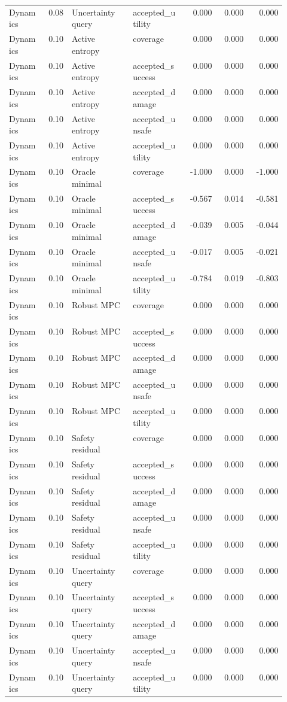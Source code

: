 \documentclass{article}
\begin{document}
\begin{center}
\begin{longtable}{p{0.13\linewidth}rp{0.22\linewidth}p{0.19\linewidth}rrr}
Dynamics & 0.08 & Uncertainty query & accepted\_utility & 0.000 & 0.000 & 0.000\\
Dynamics & 0.10 & Active entropy & coverage & 0.000 & 0.000 & 0.000\\
Dynamics & 0.10 & Active entropy & accepted\_success & 0.000 & 0.000 & 0.000\\
Dynamics & 0.10 & Active entropy & accepted\_damage & 0.000 & 0.000 & 0.000\\
Dynamics & 0.10 & Active entropy & accepted\_unsafe & 0.000 & 0.000 & 0.000\\
Dynamics & 0.10 & Active entropy & accepted\_utility & 0.000 & 0.000 & 0.000\\
Dynamics & 0.10 & Oracle minimal & coverage & -1.000 & 0.000 & -1.000\\
Dynamics & 0.10 & Oracle minimal & accepted\_success & -0.567 & 0.014 & -0.581\\
Dynamics & 0.10 & Oracle minimal & accepted\_damage & -0.039 & 0.005 & -0.044\\
Dynamics & 0.10 & Oracle minimal & accepted\_unsafe & -0.017 & 0.005 & -0.021\\
Dynamics & 0.10 & Oracle minimal & accepted\_utility & -0.784 & 0.019 & -0.803\\
Dynamics & 0.10 & Robust MPC & coverage & 0.000 & 0.000 & 0.000\\
Dynamics & 0.10 & Robust MPC & accepted\_success & 0.000 & 0.000 & 0.000\\
Dynamics & 0.10 & Robust MPC & accepted\_damage & 0.000 & 0.000 & 0.000\\
Dynamics & 0.10 & Robust MPC & accepted\_unsafe & 0.000 & 0.000 & 0.000\\
Dynamics & 0.10 & Robust MPC & accepted\_utility & 0.000 & 0.000 & 0.000\\
Dynamics & 0.10 & Safety residual & coverage & 0.000 & 0.000 & 0.000\\
Dynamics & 0.10 & Safety residual & accepted\_success & 0.000 & 0.000 & 0.000\\
Dynamics & 0.10 & Safety residual & accepted\_damage & 0.000 & 0.000 & 0.000\\
Dynamics & 0.10 & Safety residual & accepted\_unsafe & 0.000 & 0.000 & 0.000\\
Dynamics & 0.10 & Safety residual & accepted\_utility & 0.000 & 0.000 & 0.000\\
Dynamics & 0.10 & Uncertainty query & coverage & 0.000 & 0.000 & 0.000\\
Dynamics & 0.10 & Uncertainty query & accepted\_success & 0.000 & 0.000 & 0.000\\
Dynamics & 0.10 & Uncertainty query & accepted\_damage & 0.000 & 0.000 & 0.000\\
Dynamics & 0.10 & Uncertainty query & accepted\_unsafe & 0.000 & 0.000 & 0.000\\
Dynamics & 0.10 & Uncertainty query & accepted\_utility & 0.000 & 0.000 & 0.000\\
\bottomrule
\end{longtable}
\normalsize
\end{center}
\end{document}
